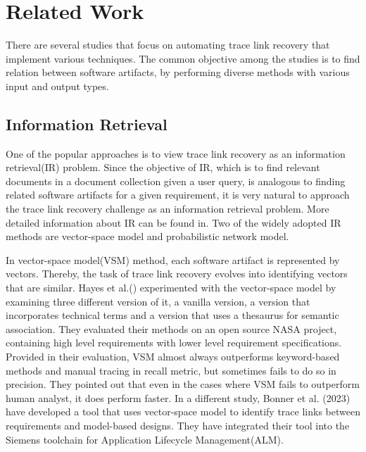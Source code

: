 \section{Related Work}
\label{section:related_work}

There are several studies that focus on automating trace link recovery that implement various techniques. The common objective among the studies is to find relation between software artifacts, by performing diverse methods with various input and output types.

\subsection{Information Retrieval}

One of the popular approaches is to view trace link recovery as an information retrieval(IR) problem. Since the objective of IR, which is to find relevant documents in a document collection given a user query, is analogous to finding related software artifacts for a given requirement, it is very natural to approach the trace link recovery challenge as an information retrieval problem. More detailed information about IR can be found in\cite{IR}. Two of the widely adopted IR methods are vector-space model and probabilistic network model.


In vector-space model(VSM) method, each software artifact is represented by vectors. Thereby, the task of trace link recovery evolves into identifying vectors that are similar. Hayes et al.()\cite{hayes-2003} experimented with the vector-space model by examining three different version of it, a vanilla version, a version that incorporates technical terms and a version that uses a thesaurus for semantic association. They evaluated their methods on an open source NASA project, containing high level requirements with lower level requirement specifications. Provided in their evaluation, VSM almost always outperforms keyword-based methods and manual tracing in recall metric, but sometimes fails to do so in precision. They pointed out that even in the cases where VSM fails to outperform human analyst, it does perform faster. In a different study, Bonner et al. (2023)\cite{bonner-2023} have developed a tool that uses vector-space model to identify trace links between requirements and model-based designs. They have integrated their tool into the Siemens toolchain for Application Lifecycle Management(ALM).

